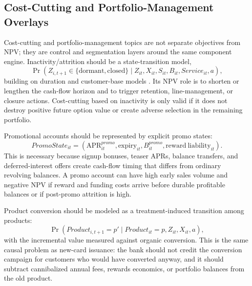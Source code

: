 \documentclass[11pt]{article}
\newcommand{\1}{\mathbf{1}}
\begin{document}
\subsection{Cost-Cutting and Portfolio-Management Overlays}
\label{subsec:overlays}

Cost-cutting and portfolio-management topics are not separate objectives from
NPV; they are control and segmentation layers around the same component engine.
Inactivity/attrition should be a state-transition model,
\begin{equation}
  \Pr(Z_{i,t+1}\in\{\mathrm{dormant},\mathrm{closed}\}
  \mid Z_{it},X_{it},S_{it},B_{it},Service_{it},a),
  \label{eq:attrition-hazard}
\end{equation}
building on duration and customer-base models
\citep{schmittlein1987counting,fader2005bgnbd,bolton1998duration}. Its NPV
role is to shorten or lengthen the cash-flow horizon and to trigger retention,
line-management, or closure actions. Cost-cutting based on inactivity is only
valid if it does not destroy positive future option value or create adverse
selection in the remaining portfolio.

Promotional accounts should be represented by explicit promo states:
\begin{equation}
  PromoState_{it}
  =
  (\mathrm{APR}^{promo}_{it},\mathrm{expiry}_{it},
   B^{promo}_{it},\mathrm{reward\ liability}_{it}).
  \label{eq:promo-state}
\end{equation}
This is necessary because signup bonuses, teaser APRs, balance transfers, and
deferred-interest offers create cash-flow timing that differs from ordinary
revolving balances. A promo account can have high early sales volume and
negative NPV if reward and funding costs arrive before durable profitable
balances or if post-promo attrition is high.

Product conversion should be modeled as a treatment-induced transition among
products:
\begin{equation}
  \Pr(Product_{i,t+1}=p'
    \mid Product_{it}=p,Z_{it},X_{it},a),
  \label{eq:product-conversion}
\end{equation}
with the incremental value measured against organic conversion. This is the
same causal problem as new-card issuance: the bank should not credit the
conversion campaign for customers who would have converted anyway, and it
should subtract cannibalized annual fees, rewards economics, or portfolio
balances from the old product.
\end{document}
